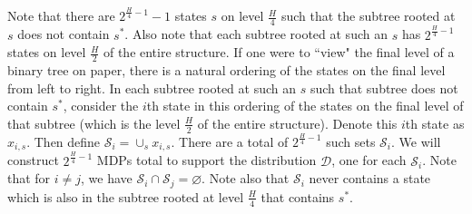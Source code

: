 \documentclass[11pt,twoside]{article}
\begin{document}
\noindent Note that there are $2^{\frac{H}{4} - 1} - 1$ states $s$ on level $\frac{H}{4}$ such that the subtree rooted at $s$ does not contain $s^*$. Also note that each subtree rooted at such an $s$ has $2^{\frac{H}{4} - 1}$ states on level $\frac{H}{2}$ of the entire structure. If one were to ``view" the final level of a binary tree on paper, there is a natural ordering of the states on the final level from left to right. In each subtree rooted at such an $s$ such that subtree does not contain $s^*$, consider the $i$th state in this ordering of the states on the final level of that subtree (which is the level $\frac{H}{2}$ of the entire structure). Denote this $i$th state as $x_{i, s}$. Then define $\mathcal{S}_i = \cup_s x_{i, s}$. There are a total of $2^{\frac{H}{4} - 1}$ such sets $\mathcal{S}_i$. We will construct $2^{\frac{H}{4} - 1}$ MDPs total to support the distribution $\mathcal{D}$, one for each $\mathcal{S}_i$. Note that for $i \neq j$, we have $\mathcal{S}_i \cap \mathcal{S}_j = \varnothing$. Note also that $\mathcal{S}_i$ never contains a state which is also in the subtree rooted at level $\frac{H}{4}$ that contains $s^*$. \\
\end{document}
